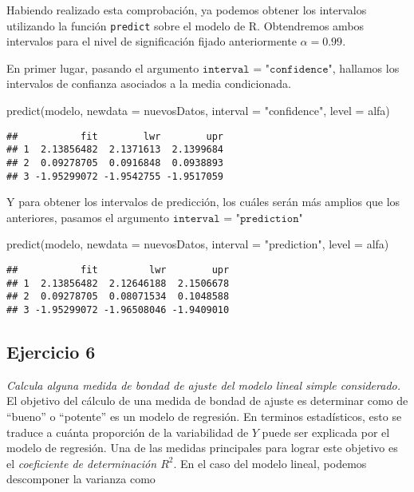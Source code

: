 \documentclass[
]{article}
\newenvironment{Shaded}{\begin{snugshade}}{\end{snugshade}}
\newcommand{\AttributeTok}[1]{\textcolor[rgb]{0.77,0.63,0.00}{#1}}
\newcommand{\FunctionTok}[1]{\textcolor[rgb]{0.00,0.00,0.00}{#1}}
\newcommand{\NormalTok}[1]{#1}
\newcommand{\StringTok}[1]{\textcolor[rgb]{0.31,0.60,0.02}{#1}}
\begin{document}
Habiendo realizado esta comprobación, ya podemos obtener los intervalos
utilizando la función \texttt{predict} sobre el modelo de R. Obtendremos
ambos intervalos para el nivel de significación fijado anteriormente
\(\alpha = 0.99\).

En primer lugar, pasando el argumento
\(\texttt{interval = "confidence"}\), hallamos los intervalos de
confianza asociados a la media condicionada.

\begin{Shaded}
\begin{Highlighting}[]
\FunctionTok{predict}\NormalTok{(modelo, }\AttributeTok{newdata =}\NormalTok{ nuevosDatos, }\AttributeTok{interval =} \StringTok{"confidence"}\NormalTok{, }\AttributeTok{level =}\NormalTok{ alfa)}
\end{Highlighting}
\end{Shaded}

\begin{verbatim}
##           fit        lwr        upr
## 1  2.13856482  2.1371613  2.1399684
## 2  0.09278705  0.0916848  0.0938893
## 3 -1.95299072 -1.9542755 -1.9517059
\end{verbatim}

Y para obtener los intervalos de predicción, los cuáles serán más
amplios que los anteriores, pasamos el argumento
\(\texttt{interval = "prediction"}\)

\begin{Shaded}
\begin{Highlighting}[]
\FunctionTok{predict}\NormalTok{(modelo, }\AttributeTok{newdata =}\NormalTok{ nuevosDatos, }\AttributeTok{interval =} \StringTok{"prediction"}\NormalTok{, }\AttributeTok{level =}\NormalTok{ alfa)}
\end{Highlighting}
\end{Shaded}

\begin{verbatim}
##           fit         lwr        upr
## 1  2.13856482  2.12646188  2.1506678
## 2  0.09278705  0.08071534  0.1048588
## 3 -1.95299072 -1.96508046 -1.9409010
\end{verbatim}

\hypertarget{ejercicio-6}{%
\subsection{Ejercicio 6}\label{ejercicio-6}}

\textit{Calcula alguna medida de bondad de ajuste del modelo lineal simple considerado.}
El objetivo del cálculo de una medida de bondad de ajuste es determinar
como de ``bueno'' o ``potente'' es un modelo de regresión. En terminos
estadísticos, esto se traduce a cuánta proporción de la variabilidad de
\(Y\) puede ser explicada por el modelo de regresión. Una de las medidas
principales para lograr este objetivo es el
\textit{coeficiente de determinación $R^2$}. En el caso del modelo
lineal, podemos descomponer la varianza como
\end{document}
